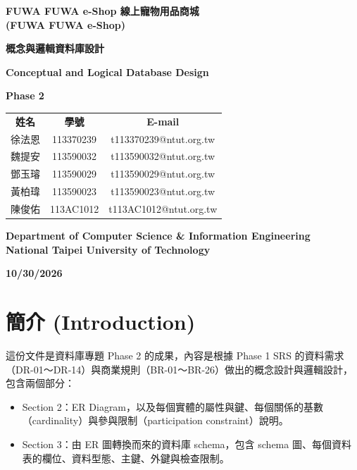 \documentclass[12pt,a4paper]{article}
\newcommand{\projectname}{FUWA FUWA e-Shop 線上寵物用品商城}
\newcommand{\projectnameEN}{FUWA FUWA e-Shop}
\newcommand{\docdate}{10/30/2026}
\begin{document}
\begin{titlepage}
\centering
\vspace*{1.5cm}
{\Large\bfseries \projectname\\[0.3em] (\projectnameEN)\par}
\vspace{1.5cm}
{\LARGE\bfseries 概念與邏輯資料庫設計\par}
\vspace{0.5cm}
{\Large\bfseries Conceptual and Logical Database Design\par}
\vspace{0.5cm}
{\large\bfseries Phase 2\par}
\vspace{1.2cm}
\renewcommand{\arraystretch}{1.4}
\begin{tabular}{ccc}
\textbf{姓名} & \textbf{學號} & \textbf{E-mail}\\
徐法恩 & 113370239 & t113370239@ntut.org.tw\\
魏提安 & 113590032 & t113590032@ntut.org.tw\\
鄧玉璿 & 113590029 & t113590029@ntut.org.tw\\
黃柏瑋 & 113590023 & t113590023@ntut.org.tw\\
陳俊佑 & 113AC1012 & t113AC1012@ntut.org.tw\\
\end{tabular}
\vfill
{\large\bfseries Department of Computer Science \& Information Engineering\\
National Taipei University of Technology\par}
\vspace{1cm}
{\large\bfseries \docdate\par}
\vspace*{1cm}
\end{titlepage}

\setcounter{page}{1}
\tableofcontents
\clearpage
{}
\setcounter{page}{1}

\section{簡介 (Introduction)}

這份文件是資料庫專題 Phase 2 的成果，內容是根據 Phase 1 SRS 的資料需求（DR-01～DR-14）與商業規則（BR-01～BR-26）做出的概念設計與邏輯設計，包含兩個部分：

\begin{itemize}
  \item Section 2：ER Diagram，以及每個實體的屬性與鍵、每個關係的基數（cardinality）與參與限制（participation constraint）說明。
  \item Section 3：由 ER 圖轉換而來的資料庫 schema，包含 schema 圖、每個資料表的欄位、資料型態、主鍵、外鍵與檢查限制。
\end{itemize}
\end{document}
